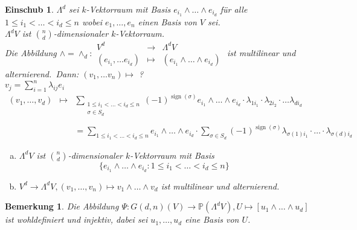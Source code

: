 \documentclass[a4paper,12pt]{report}
\theoremstyle{break}
\newtheorem{Bem}[Def]{Bemerkung}
\newtheorem{Einsch}[Def]{Einschub}
\theoremstyle{nonumberbreak}
\theoremstyle{nonumberplain}
\newcommand{\Sum}{\sum\limits}
\DeclareMathOperator{\sign}{sign}
\newcommand{\IP}{\mathbb{P}}%
\begin{document}
\begin{Einsch}
$\Lambda^d$ sei $k$-Vektorraum mit Basis $e_{i_1}\wedge\ldots \wedge e_{i_d}$ f\"ur alle $1\le i_1 < \ldots < i_d \le n$ wobei $e_1,\ldots ,e_n$ einen Basis von $V$ sei.\\
$\Lambda^dV$ ist $\binom{n}{d}$-dimensionaler $k$-Vektorraum.\\
Die Abbildung $\wedge=\wedge_d:\begin{array}{rcl} V^d &\to& \Lambda^dV\\ (e_{i_1},\ldots e_{i_d}) &\mapsto& (e_{i_1}\wedge\ldots \wedge e_{i_d})\end{array}$ ist multilinear und alternierend.\
\emph{Dann}: $(v_1,\ldots v_n)\mapsto$ ?\\
$v_j=\Sum_{i=1}^n\lambda_{ij}e_i$\\
$\begin{array}{rcl}
	(v_1,\ldots ,v_d)&\mapsto& \Sum_{\substack{1\le i_1<\ldots <i_d\le n\\\sigma \in S_d}}(-1)^{\sign(\sigma)}e_{i_1}\wedge\ldots \wedge e_{i_d}\cdot \lambda_{1i_1}\cdot \lambda_{2i_2}\cdot\ldots \lambda_{di_d} \\ &&\\ %
	&&= \Sum_{1\le i_1 <\ldots <i_d\le n} e_{i_1}\wedge\ldots \wedge e_{i_d}\cdot \Sum_{\sigma \in S_d}(-1)^{\sign(\sigma)}\lambda_{\sigma(1)i_1}\cdot \ldots \cdot \lambda_{\sigma(d)i_d}
\end{array}$\begin{enumerate}[a)]

\item
	$\Lambda^dV$ ist $\binom{n}{d}$-dimensionaler $k$-Vektorraum mit Basis
		\[\{  e_{i_1}\wedge\ldots \wedge e_{i_d} : 1\le i_1 <\ldots <i_d\le n \}\]

\item
	$V^d\to \Lambda^dV, (v_1,\ldots ,v_n)\mapsto v_1\wedge\ldots \wedge v_d$ ist multilinear und alternierend.
\end{enumerate}\end{Einsch}

\begin{Bem}
Die Abbildung $\Psi:G(d,n)(V)\to \IP(\Lambda^dV), U\mapsto [u_1\wedge\ldots \wedge u_d]$ ist wohldefiniert und injektiv, dabei sei $u_1,\ldots ,u_d$ eine Basis von $U$.
\end{Bem}
\end{document}

